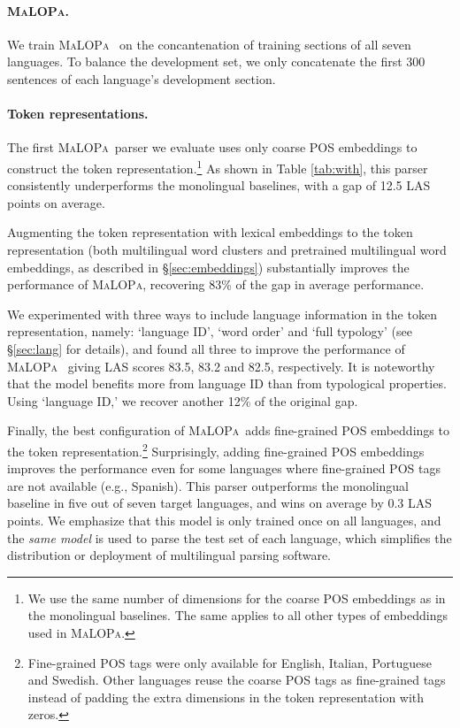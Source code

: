 \documentclass[11pt]{article}
\newcommand{\malopa}{\textsc{MaLOPa}}
\begin{document}
\paragraph{\malopa.}
We train  \malopa~ on the concantenation of training sections of all seven languages.
To balance the development set, we only concatenate the first 300 sentences of each language's development section.

\paragraph{Token representations.}
The first \malopa~parser we evaluate uses only coarse POS embeddings to construct the token representation.\footnote{We use the same number of dimensions for the coarse POS embeddings as in the monolingual baselines. The same applies to all other types of embeddings used in \malopa.}
As shown in Table \ref{tab:with}, this parser consistently underperforms the monolingual baselines, with a gap of 12.5 LAS points on average.

Augmenting the token representation with lexical embeddings to the token representation (both multilingual word clusters and pretrained multilingual word embeddings, as described in \S\ref{sec:embeddings}) substantially improves the performance of \malopa, recovering 83\% of the gap in average performance.

We experimented with three ways to include language information in the token representation, namely: `language ID', `word order' and `full typology' (see \S\ref{sec:lang} for details), and found all three to improve the performance of \malopa~ giving LAS scores 83.5, 83.2 and 82.5, respectively.
It is noteworthy that the model benefits more from language ID than from typological properties.
Using `language ID,' we recover another 12\% of the original gap.


Finally, the best configuration of \malopa~adds fine-grained POS embeddings to the token representation.\footnote{Fine-grained POS tags were only available for English, Italian, Portuguese and Swedish. Other languages reuse the coarse POS tags as fine-grained tags instead of padding the extra dimensions in the token representation with zeros.}
Surprisingly, adding fine-grained POS embeddings improves the performance even for some languages where fine-grained POS tags are not available (e.g., Spanish).
This parser outperforms the monolingual baseline in five out of seven target languages, and wins on average by 0.3 LAS points.
We emphasize that this model is only trained once on all languages, and the \textit{same model} is used to parse the test set of each language, which simplifies the distribution or deployment of multilingual parsing software.
\end{document}
